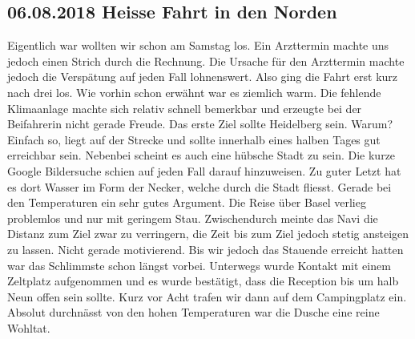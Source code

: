 
\subsection{06.08.2018 Heisse Fahrt in den Norden} 
Eigentlich war wollten wir schon am Samstag los. Ein Arzttermin machte uns jedoch einen Strich durch die Rechnung.
Die Ursache für den Arzttermin machte jedoch die Verspätung auf jeden Fall lohnenswert.
Also ging die Fahrt erst kurz nach drei los.
Wie vorhin schon erwähnt war es ziemlich warm.
Die fehlende Klimaanlage machte sich relativ schnell bemerkbar und erzeugte bei der Beifahrerin nicht gerade Freude.
Das erste Ziel sollte Heidelberg sein.
Warum?
Einfach so, liegt auf der Strecke und sollte innerhalb eines halben Tages gut erreichbar sein.
Nebenbei scheint es auch eine hübsche Stadt zu sein. 
Die kurze Google Bildersuche schien auf jeden Fall darauf hinzuweisen.
Zu guter Letzt hat es dort Wasser im Form der Necker, welche durch die Stadt fliesst.
Gerade bei den Temperaturen ein sehr gutes Argument.
Die Reise über Basel verlieg problemlos und nur mit geringem Stau.
Zwischendurch meinte das Navi die Distanz zum Ziel zwar zu verringern, die Zeit bis zum Ziel jedoch stetig ansteigen zu lassen.
Nicht gerade motivierend.
Bis wir jedoch das Stauende erreicht hatten war das Schlimmste schon längst vorbei.
Unterwegs wurde Kontakt mit einem Zeltplatz aufgenommen und es wurde bestätigt, dass die Reception bis um halb Neun offen sein sollte.
Kurz vor Acht trafen wir dann auf dem Campingplatz ein.
Absolut durchnässt von den hohen Temperaturen war die Dusche eine reine Wohltat.
